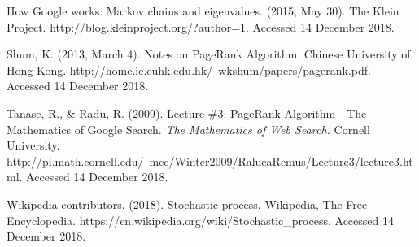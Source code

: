 \documentclass[11pt]{article}
\theoremstyle{definition}
\begin{document}
\begin{thebibliography}{9}
\bibitem{}
How Google works: Markov chains and eigenvalues. (2015, May 30). The Klein Project. http://blog.kleinproject.org/?author=1. Accessed 14 December 2018.

\bibitem{}
Shum, K. (2013, March 4). Notes on PageRank Algorithm. Chinese University of Hong Kong. http://home.ie.cuhk.edu.hk/~wkshum/papers/pagerank.pdf. Accessed 14 December 2018.

\bibitem{}
Tanase, R., \& Radu, R. (2009). Lecture \#3: PageRank Algorithm - The Mathematics of Google Search.
\textit{The Mathematics of Web Search.} Cornell University. 
http://pi.math.cornell.edu/~mec/Winter2009/RalucaRemus/Lecture3/lecture3.html. Accessed 14 December 2018.

\bibitem{}
Wikipedia contributors. (2018). Stochastic process. Wikipedia, The Free Encyclopedia. https://en.wikipedia.org/wiki/Stochastic\_process. Accessed 14 December 2018.

\end{thebibliography}
\end{document}
